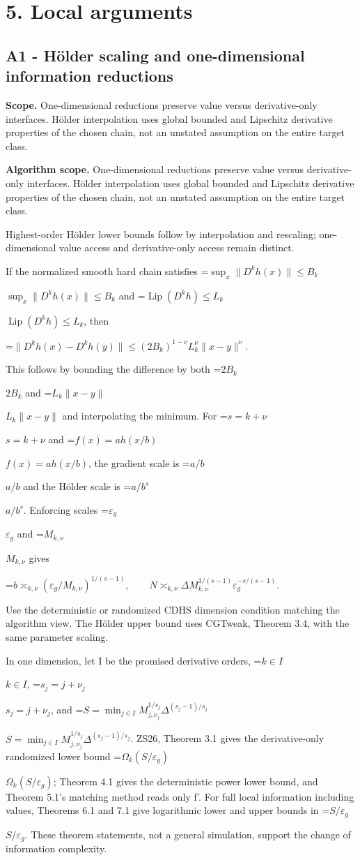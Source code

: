 \documentclass[10pt,a4paper]{article}
\newcommand{\AtlasMath}[1]{\par\begingroup\centering\setbox0=\hbox{$\displaystyle #1$}\ifdim\wd0>1.4\linewidth\typeout{ATLAS WIDE FORMULA: \the\wd0}\fi\ifdim\wd0>\linewidth\resizebox{\linewidth}{!}{\box0}\else\box0\fi\par\endgroup}
\newcommand{\AtlasInlineMath}[1]{\begingroup\setbox0=\hbox{$#1$}\ifdim\wd0>.4\linewidth\endgroup\AtlasMath{#1}\else\endgroup$#1$\fi}
\begin{document}
\section{5. Local arguments}
\subsection{A1 - Hölder scaling and one-dimensional information reductions}
\textbf{Scope.} One-dimensional reductions preserve value versus derivative-only interfaces. Hölder interpolation uses global bounded and Lipschitz derivative properties of the chosen chain, not an unstated assumption on the entire target class.

\textbf{Algorithm scope.} One-dimensional reductions preserve value versus derivative-only interfaces. Hölder interpolation uses global bounded and Lipschitz derivative properties of the chosen chain, not an unstated assumption on the entire target class.

Highest-order Hölder lower bounds follow by interpolation and rescaling; one-dimensional value access and derivative-only access remain distinct.

If the normalized smooth hard chain satisfies \AtlasInlineMath{\sup_x\|D^kh(x)\|\le B_k} and \AtlasInlineMath{\operatorname{Lip}(D^kh)\le L_k}, then

\AtlasMath{\|D^kh(x)-D^kh(y)\|\le(2B_k)^{1-\nu}L_k^\nu\|x-y\|^\nu.}

This follows by bounding the difference by both \AtlasInlineMath{2B_k} and \AtlasInlineMath{L_k\|x-y\|} and interpolating the minimum. For \AtlasInlineMath{s=k+\nu} and \AtlasInlineMath{f(x)=a h(x/b)}, the gradient scale is \AtlasInlineMath{a/b} and the Hölder scale is \AtlasInlineMath{a/b^s}. Enforcing scales \AtlasInlineMath{\varepsilon_g} and \AtlasInlineMath{M_{k,\nu}} gives

\AtlasMath{b\asymp_{k,\nu}(\varepsilon_g/M_{k,\nu})^{1/(s-1)},\qquad
N\asymp_{k,\nu}\Delta M_{k,\nu}^{1/(s-1)}\varepsilon_g^{-s/(s-1)}.}

Use the deterministic or randomized CDHS dimension condition matching the algorithm view. The Hölder upper bound uses CGTweak, Theorem 3.4, with the same parameter scaling.

In one dimension, let I be the promised derivative orders, \AtlasInlineMath{k\in I}, \AtlasInlineMath{s_j=j+\nu_j}, and \AtlasInlineMath{S=\min_{j\in I}M_{j,\nu_j}^{1/s_j}\Delta^{(s_j-1)/s_j}}. ZS26, Theorem 3.1 gives the derivative-only randomized lower bound \AtlasInlineMath{\Omega_k(S/\varepsilon_g)}; Theorem 4.1 gives the deterministic power lower bound, and Theorem 5.1's matching method reads only f'. For full local information including values, Theorems 6.1 and 7.1 give logarithmic lower and upper bounds in \AtlasInlineMath{S/\varepsilon_g}. These theorem statements, not a general simulation, support the change of information complexity.
\end{document}

